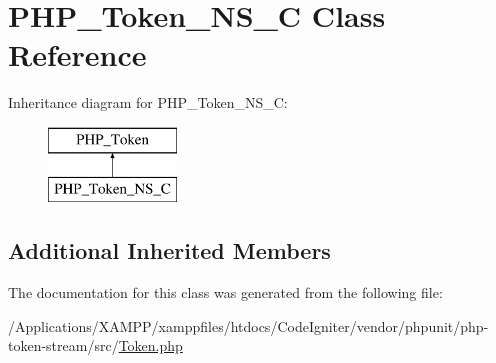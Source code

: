 \hypertarget{class_p_h_p___token___n_s___c}{}\section{P\+H\+P\+\_\+\+Token\+\_\+\+N\+S\+\_\+C Class Reference}
\label{class_p_h_p___token___n_s___c}
Inheritance diagram for P\+H\+P\+\_\+\+Token\+\_\+\+N\+S\+\_\+C\+:\begin{figure}[H]
\begin{center}
\leavevmode
\includegraphics[height=2.000000cm]{class_p_h_p___token___n_s___c}
\end{center}
\end{figure}
\subsection*{Additional Inherited Members}


The documentation for this class was generated from the following file\+:\begin{DoxyCompactItemize}
\item 
/\+Applications/\+X\+A\+M\+P\+P/xamppfiles/htdocs/\+Code\+Igniter/vendor/phpunit/php-\/token-\/stream/src/\mbox{\hyperlink{_token_8php}{Token.\+php}}\end{DoxyCompactItemize}

